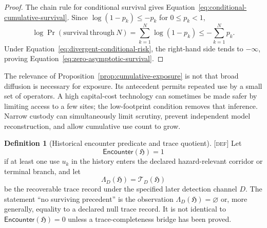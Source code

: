 \documentclass[11pt]{article}
\newcommand{\Defn}{\textsc{[def]}}
\theoremstyle{definition}
\newtheorem{sdefinition}{Definition}
\begin{document}
\begin{proof}
The chain rule for conditional survival gives
Equation~\eqref{eq:conditional-cumulative-survival}. Since
$\log(1-p_k)\leq -p_k$ for $0\leq p_k<1$,
\begin{equation}
\log\Pr(\mathrm{survival\ through\ }N)
=
\sum_{k=1}^{N}\log(1-p_k)
\leq
-\sum_{k=1}^{N}p_k.
\end{equation}
Under Equation~\eqref{eq:divergent-conditional-risk}, the right-hand side
tends to $-\infty$, proving Equation~\eqref{eq:zero-asymptotic-survival}.
\end{proof}

The relevance of Proposition~\ref{prop:cumulative-exposure} is not that broad
diffusion is necessary for exposure. Its antecedent permits repeated use by a
small set of operators. A high capital-cost technology can sometimes be made safer
by limiting access to a few sites; the low-footprint condition removes that
inference. Narrow custody can simultaneously limit scrutiny, prevent independent
model reconstruction, and allow cumulative use count to grow.

\begin{sdefinition}[Historical encounter predicate and trace quotient]
\label{def:historical-encounter}
\Defn{} Let
\begin{equation}
\mathsf{Encounter}(\mathfrak H)=1
\label{eq:encounter-predicate}
\end{equation}
if at least one use $u_k$ in the history enters the declared hazard-relevant
corridor or terminal branch, and let
\begin{equation}
\Lambda_D(\mathfrak H)=\mathcal T_D(\mathfrak H)
\label{eq:trace-quotient}
\end{equation}
be the recoverable trace record under the specified later detection channel $D$.
The statement ``no surviving precedent'' is the observation
$\Lambda_D(\mathfrak H)=\varnothing$ or, more generally, equality to a declared
null trace record. It is not identical to
$\mathsf{Encounter}(\mathfrak H)=0$ unless a trace-completeness bridge has been
proved.
\end{sdefinition}
\end{document}
